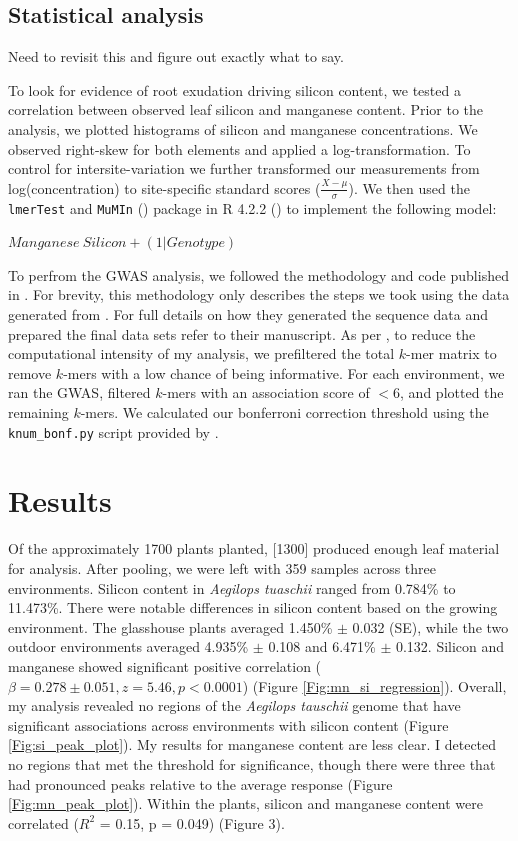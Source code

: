 \documentclass[12pt, letterpaper, ]{report}
\begin{document}
\subsection{Statistical analysis}

Need to revisit this and figure out exactly what to say.

To look for evidence of root exudation driving silicon content, we tested a correlation between observed leaf silicon and manganese content. Prior to the analysis, we plotted histograms of silicon and manganese concentrations. We observed right-skew for both elements and applied a log-transformation. To control for intersite-variation we further transformed our measurements from log(concentration) to site-specific standard scores ($\frac{X - \mu}{\sigma}$). We then used the \verb|lmerTest| and \verb|MuMIn| (\cite{kuznetsova_2017_lmerTest,barton_2023_mumin}) package in R 4.2.2 (\cite{r_core_team_2022}) to implement the following model: 

$Manganese ~ Silicon + (1|Genotype)$

To perfrom the GWAS analysis, we followed the methodology and code published in \textcite{gaurav_population_2022}. For brevity, this methodology only describes the steps we took using the data generated from \textcite{gaurav_population_2022}. For full details on how they generated the sequence data and prepared the final data sets refer to their manuscript. As per \textcite{gaurav_population_2022}, to reduce the computational intensity of my analysis, we prefiltered the total $k$-mer matrix to remove $k$-mers with a low chance of being informative. For each environment, we ran the GWAS, filtered $k$-mers with an association score of $<6$, and plotted the remaining $k$-mers. We calculated our bonferroni correction threshold using the \verb|knum_bonf.py| script provided by \textcite{gaurav_population_2022}. 

\section{Results}

Of the approximately 1700 plants planted, [1300] produced enough leaf material for analysis. After pooling, we were left with 359 samples across three environments. Silicon content in \textit{Aegilops tuaschii} ranged from 0.784\% to 11.473\%. There were notable differences in silicon content based on the growing environment. The glasshouse plants averaged 1.450\% $\pm$ 0.032 (SE), while the two outdoor environments averaged 4.935\% $\pm$ 0.108 and 6.471\% $\pm$ 0.132. Silicon and manganese showed significant positive correlation ($\beta = 0.278\pm0.051, z = 5.46, p<0.0001$) (Figure \ref{Fig:mn_si_regression}). Overall, my analysis revealed no regions of the \textit{Aegilops tauschii} genome that have significant associations across environments with silicon content (Figure \ref{Fig:si_peak_plot}). My results for manganese content are less clear. I detected no regions that met the threshold for significance, though there were three that had pronounced peaks relative to the average response (Figure \ref{Fig:mn_peak_plot}). Within the plants, silicon and manganese content were correlated ($R^2$ = 0.15, p = 0.049) (Figure 3). 
\end{document}
